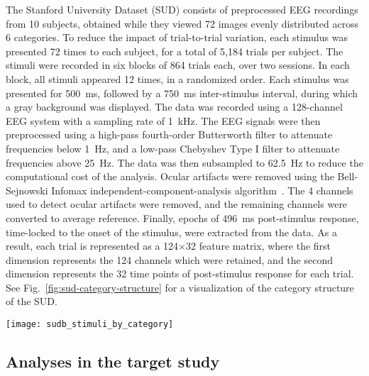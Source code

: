 The Stanford University Dataset (SUD) consists of preprocessed EEG recordings from 10 subjects, obtained while they viewed 72 images evenly distributed across 6 categories. To reduce the impact of trial-to-trial variation, each stimulus was presented 72 times to each subject, for a total of 5,184 trials per subject. The stimuli were recorded in six blocks of 864 trials each, over two sessions. In each block, all stimuli appeared 12 times, in a randomized order. Each stimulus was presented for 500~ms, followed by a 750~ms inter-stimulus interval, during which a gray background was displayed. The data was recorded using a 128-channel EEG system with a sampling rate of 1~kHz. The EEG signals were then preprocessed using a high-pass fourth-order Butterworth filter to attenuate frequencies below 1~Hz, and a low-pass Chebyshev Type I filter to attenuate frequencies above 25~Hz. The data was then subsampled to 62.5~Hz to reduce the computational cost of the analysis. Ocular artifacts were removed using the Bell-Sejnowski Infomax independent-component-analysis algorithm~\cite{Bell-Sejnowski:1995}.  The 4 channels used to detect ocular artifacts were removed, and the remaining channels were converted to average reference. Finally, epochs of 496~ms post-stimulus response, time-locked to the onset of the stimulus, were extracted from the data. As a result, each trial is represented as a 124$\times$32 feature matrix, where the first dimension represents the 124 channels which were retained, and the second dimension represents the 32 time points of post-stimulus response for each trial. See Fig.~\ref{fig:sud-category-structure} for a visualization of the category structure of the SUD. 

\begin{SCfigure}
    \centering
    \texttt{[image: sudb\_stimuli\_by\_category]}
  \caption{\textbf{The category and structure of the SUD stimulus set.} The stimulus set used in the SUD is composed of 72 images of natural objects. In the original category structure of the SUD (left), these stimuli are evenly distributed across six categories: Human Body (HB), Human Face (HF), Animal Body (AB), Animal Face (AF), Fruit/Vegetable (FV), and Inanimate Object (IO). These can be further grouped into Animate and Inanimate supercategories.\vspace{15em}}
  \label{fig:sud-category-structure}
\end{SCfigure}

\subsection{Analyses in the target study}

